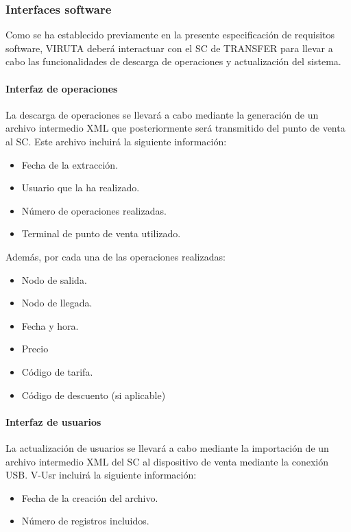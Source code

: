 \subsubsection{Interfaces software}

Como se ha establecido previamente en la presente especificación de requisitos software, VIRUTA deberá interactuar con el SC de TRANSFER para llevar a cabo las funcionalidades de descarga de operaciones y actualización del sistema.

\paragraph{Interfaz de operaciones}

La descarga de operaciones se llevará a cabo mediante la generación de un archivo intermedio XML que posteriormente será transmitido del punto de venta al SC. Este archivo incluirá la siguiente información:

\begin{itemize}
\item Fecha de la extracción.
\item Usuario que la ha realizado.
\item Número de operaciones realizadas.
\item Terminal de punto de venta utilizado.
\end{itemize}

Además, por cada una de las operaciones realizadas:

\begin{itemize}
\item Nodo de salida.
\item Nodo de llegada.
\item Fecha y hora.
\item Precio
\item Código de tarifa.
\item Código de descuento (si aplicable)
\end{itemize}

\paragraph{Interfaz de usuarios}

La actualización de usuarios se llevará a cabo mediante la importación de un archivo intermedio XML del SC al dispositivo de venta mediante la conexión USB. V-Usr incluirá la siguiente información:

\begin{itemize}
\item Fecha de la creación del archivo.
\item Número de registros incluidos.
\end{itemize}

